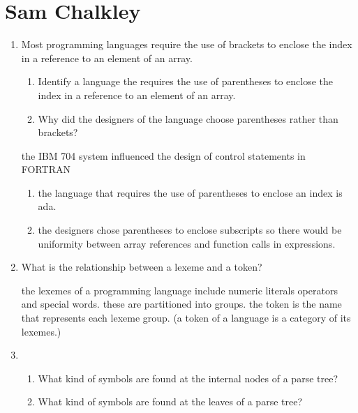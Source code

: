 
\chapter{Sam Chalkley}

\begin{enumerate}
  \item Most programming languages require the use of brackets to
    enclose the index in a reference to an element of an array.
  \begin{enumerate}
    \item Identify a language the requires the use of parentheses
      to enclose the index in a reference to an element of an array.
    \item Why did the designers of the language choose parentheses
      rather than brackets?
    \end{enumerate}

  \begin{answer}
    the IBM 704 system influenced the design of control statements in FORTRAN
   

  \begin{enumerate}
    \item the language that requires the use of parentheses to enclose
      an index is ada.
    \item the designers chose parentheses to enclose subscripts so
      there would be uniformity between array references and function
      calls in expressions.
    \end{enumerate}

    \end{answer}
    
  \item What is the relationship between a lexeme and a token?

  \begin{answer}

    the lexemes of a programming language include numeric literals
    operators and special words. these are partitioned into
    groups. the token is the name that represents each lexeme
    group. (a token of a language is a category of its lexemes.)

    \end{answer}

  \item
  \begin{enumerate}
    \item What kind of symbols are found at the internal nodes of a
      parse tree?
    \item What kind of symbols are found at the leaves of a parse tree?
    \end{enumerate}


\end{enumerate}
